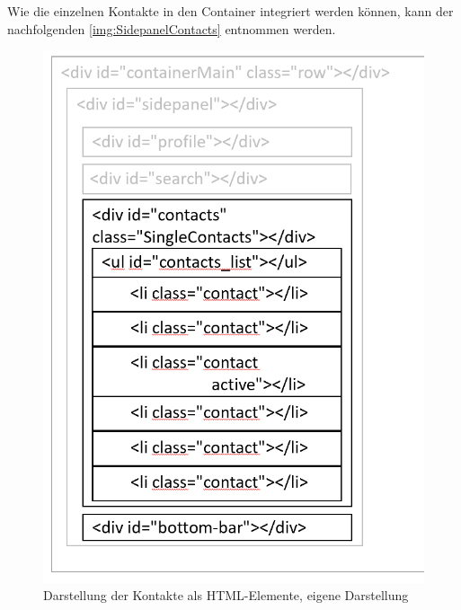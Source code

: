 \documentclass[a4paper,titlepage,halfparskip,12pt]{scrreprt}
\begin{document}
\begin{onehalfspacing}
Wie die einzelnen Kontakte in den Container integriert werden können, kann der nachfolgenden \autoref{img:SidepanelContacts} entnommen werden. 
\begin{figure}[h]
	\begin{minipage}[c]{.48\textwidth}
		\centering
		\includegraphics[scale=0.52]{images/SidepanelContacts}
		\caption{Darstellung der Kontakte als HTML-Elemente, eigene Darstellung}
		\label{img:SidepanelContacts}
	\end{minipage}
	\hspace{0.04\linewidth}%
	\begin{minipage}[c]{.45\textwidth}
		\centering

\end{minipage}
\end{figure}
\end{onehalfspacing}
\end{document}
